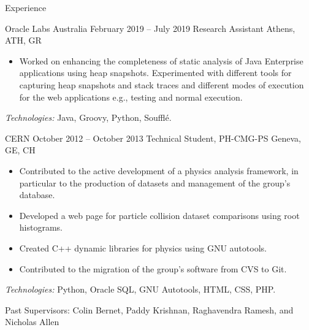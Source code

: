\documentclass{resume}
\begin{document}
\begin{rSection}{Experience}
\begin{rSubsection}
  {Oracle Labs Australia}
  {February 2019 -- July 2019}
  {Research Assistant}
  {Athens, ATH, GR}
  \begin{itemize}[label={-}]
    \setlength\itemsep{-0.5em}
    \item Worked on enhancing the completeness of static analysis of Java Enterprise applications using heap snapshots. Experimented with different tools for capturing heap snapshots and stack traces and different modes of execution for the web applications e.g., testing and normal execution.
  \end{itemize}
\footnotesize\textcolor{TechsColor}{\textit{Technologies:} Java, Groovy, Python, Soufflé.}\\
\end{rSubsection}

\begin{rSubsection}
  {CERN}
  {October 2012 -- October 2013}
  {Technical Student, PH-CMG-PS}
  {Geneva, GE, CH}

  \begin{itemize}[label={-}]
    \setlength\itemsep{-0.5em}
    \item Contributed to the active development of a physics analysis framework, in particular to the production of datasets and management of the group's database.
    \item Developed a web page for particle collision dataset comparisons using root histograms.
    \item Created C++ dynamic libraries for physics using GNU autotools.
    \item Contributed to the migration of the group's software from CVS to Git.
  \end{itemize}
  \footnotesize\textcolor{TechsColor}{\textit{Technologies:} Python, Oracle SQL, GNU Autotools, HTML, CSS, PHP.}\\
\end{rSubsection}
  Past Supervisors: Colin Bernet, Paddy Krishnan, Raghavendra Ramesh, and Nicholas Allen \\
\end{rSection}
\end{document}
